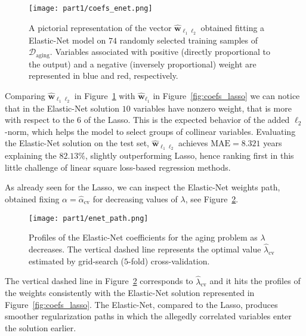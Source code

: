 			\begin{figure}[!h]
				\centering
				\texttt{[image: part1/coefs\_enet.png]}
				\caption{A pictorial representation of the vector $\bm{\hat w}_{\ell_1\ell_2}$ obtained fitting a Elastic-Net model on $74$ randomly selected training samples of $\mathcal{D}_{\text{aging}}$. Variables associated with positive (\ie directly proportional to the output) and a negative (\ie inversely proportional) weight are represented in blue and red, respectively.} \label{fig:coefs_enet}
		  \end{figure}

			Comparing $\bm{\hat w}_{\ell_1\ell_2}$ in Figure~\ref{fig:coefs_enet} with $\bm{\hat w}_{\ell_1}$ in Figure~\ref{fig:coefs_lasso} we can notice that in the Elastic-Net solution $10$ variables have nonzero weight, that is more with respect to the $6$ of the Lasso. This is the expected behavior of the added $\ell_2$-norm, which helps the model to select groups of collinear variables. Evaluating the Elastic-Net solution on the test set, $\bm{\hat w}_{\ell_1\ell_2}$ achieves $\text{MAE} = 8.321$ years explaining the $82.13\%$, slightly outperforming Lasso, hence ranking first in this little challenge of linear square loss-based regression methods.

			As already seen for the Lasso, we can inspect the Elastic-Net weights path, obtained fixing $\alpha = \hat \alpha_{\text{cv}}$ for decreasing values of $\lambda$, see Figure~\ref{fig:enet_path}.
			\begin{figure}[!h]
				\centering
				\texttt{[image: part1/enet\_path.png]}
				\caption{Profiles of the Elastic-Net coefficients for the aging problem as $\lambda$ decreases. The vertical dashed line represents the optimal value $\hat \lambda_{\text{cv}}$ estimated by grid-search ($5$-fold) cross-validation.} \label{fig:enet_path}
			\end{figure}
			The vertical dashed line in Figure~\ref{fig:enet_path} corresponds to $\hat \lambda_{\text{cv}}$ and it hits the profiles of the weights consistently with the Elastic-Net solution represented in Figure~\ref{fig:coefs_lasso}. The Elastic-Net, compared to the Lasso, produces smoother regularization paths in which the allegedly correlated variables enter the solution earlier.

